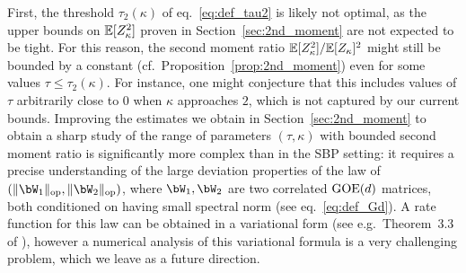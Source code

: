 \myskip
First, the threshold $\tau_2(\kappa)$ of eq.~\eqref{eq:def_tau2} is likely not optimal, 
as the upper bounds on $\mathbb{E}[Z_\kappa^2]$ proven in Section~\ref{sec:2nd_moment} are not expected to be tight.
For this reason, the second moment ratio $\mathbb{E}[Z_\kappa^2]/\mathbb{E}[Z_\kappa]^2$ might still be bounded by a constant (cf.\ Proposition~\ref{prop:2nd_moment}) even for some values $\tau \leq \tau_2(\kappa)$. 
For instance, one might conjecture that this includes values of $\tau$ arbitrarily close to $0$ when $\kappa$ approaches $2$, which is not captured by our current bounds.
Improving the estimates we obtain in Section~\ref{sec:2nd_moment} to obtain a sharp study of the range of parameters $(\tau, \kappa)$ with bounded second moment ratio is significantly more complex than in the SBP setting:
it requires a precise understanding of the large deviation properties of the law of $(\|\bW_1\|_\op, \|\bW_2\|_\op)$, where $\bW_1, \bW_2$ are two correlated $\mathrm{GOE}(d)$ matrices, both conditioned on having small spectral norm (see eq.~\eqref{eq:def_Gd}). 
A rate function for this law can be obtained in a variational form (see e.g.\ Theorem~3.3 of \cite{guionnet2004first}), however a numerical analysis of this variational formula 
is a very challenging problem, which we leave as a future direction.

